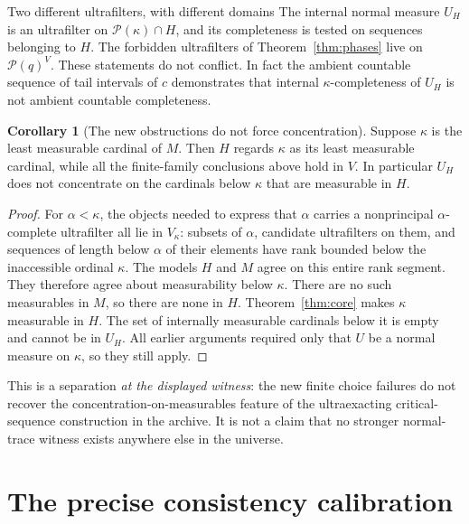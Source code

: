\documentclass[11pt,letterpaper]{article}
\theoremstyle{definition}
\newtheorem{corollary}[definition]{Corollary}
\numberwithin{equation}{section}
\newcommand{\powerset}{\mathcal P}
\begin{document}
\begin{assessment}{Two different ultrafilters, with different domains}
The internal normal measure $U_H$ is an ultrafilter on
$\powerset(\kappa)\cap H$, and its completeness is tested on sequences
belonging to $H$. The forbidden ultrafilters of
Theorem~\ref{thm:phases} live on $\powerset(q)^V$. These statements do not
conflict. In fact the ambient countable sequence of tail intervals of
$c$ demonstrates that internal $\kappa$-completeness of $U_H$ is not
ambient countable completeness.
\end{assessment}

\begin{corollary}[The new obstructions do not force concentration]\label{cor:firstmeas}
Suppose $\kappa$ is the least measurable cardinal of $M$. Then $H$ regards
$\kappa$ as its least measurable cardinal, while all the finite-family
conclusions above hold in $V$. In particular $U_H$ does not concentrate
on the cardinals below $\kappa$ that are measurable in $H$.
\end{corollary}

\begin{proof}
For $\alpha<\kappa$, the objects needed to express that $\alpha$ carries
a nonprincipal $\alpha$-complete ultrafilter all lie in $V_\kappa$:
subsets of $\alpha$, candidate ultrafilters on them, and sequences of
length below $\alpha$ of their elements have rank bounded below the
inaccessible ordinal $\kappa$. The models $H$ and $M$ agree on this entire
rank segment. They therefore agree about measurability below $\kappa$.
There are no such measurables in $M$, so there are none in $H$.
Theorem~\ref{thm:core} makes $\kappa$ measurable in $H$. The set of
internally measurable cardinals below it is empty and cannot be in
$U_H$. All earlier arguments required only that $U$ be a normal measure
on $\kappa$, so they still apply.
\end{proof}

This is a separation \emph{at the displayed witness}: the new finite
choice failures do not recover the concentration-on-measurables feature
of the ultraexacting critical-sequence construction in the archive. It
is not a claim that no stronger normal-trace witness exists anywhere else
in the universe.

\section{The precise consistency calibration}\label{sec:consistency}
\end{document}

